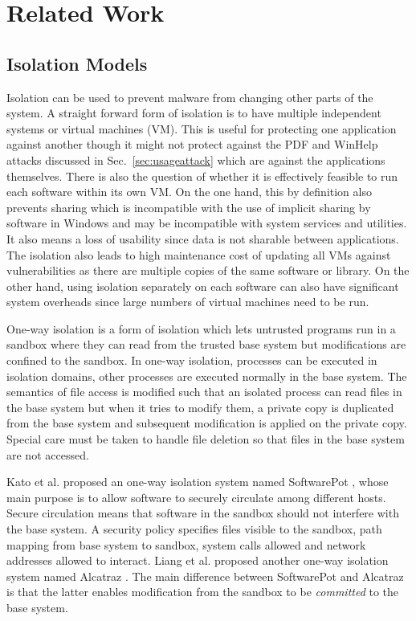 \section{Related Work}
\label{sec:prevworks}


\subsection{Isolation Models}

Isolation can be used to prevent malware from changing
other parts of the system.
A straight forward form of isolation is to have 
multiple independent systems or virtual machines (VM).
This is useful for protecting one application against another though
it might not protect against the PDF and WinHelp attacks discussed in
Sec.~\ref{sec:usageattack} which are against the applications themselves.
There is also the question of whether it is effectively feasible to 
run each software within its own VM.
On the one hand,
this by definition also prevents sharing which is incompatible
with the use of implicit sharing by software in Windows and
may be incompatible with system services and utilities.
It also means a loss of usability since data is not sharable
between applications.
The isolation also leads to high
maintenance cost of updating all VMs against
vulnerabilities as there are multiple copies of
the same software or library.
On the other hand, using isolation separately on each software can also
have significant system overheads since large numbers of virtual machines
need to be run.

One-way isolation is a form of isolation which
lets untrusted programs run in a sandbox where they can read from the
trusted base system but modifications are confined to the sandbox.
In one-way isolation, processes can be executed in isolation domains,
other processes are executed normally in the base system.
The semantics of file access is modified such that an isolated process
can read files in the base system but when it tries to modify them,
a private copy is duplicated from the base system and subsequent modification
is applied on the private copy.
Special care must be taken to handle file deletion so that files in the
base system are not accessed.

Kato et al. proposed an one-way isolation system named
SoftwarePot \cite{softwarepot},
whose main purpose is to allow software to securely circulate among
different hosts.
Secure circulation means that software in the sandbox should not interfere
with the base system.
A security policy specifies files visible to the sandbox,
path mapping from base system to sandbox, system calls allowed and
network addresses allowed to interact.
Liang et al. proposed another one-way isolation system named
Alcatraz \cite{alcatraz}.
The main difference between SoftwarePot and Alcatraz is that the latter
enables modification from the sandbox to be {\em committed} to the base
system.

